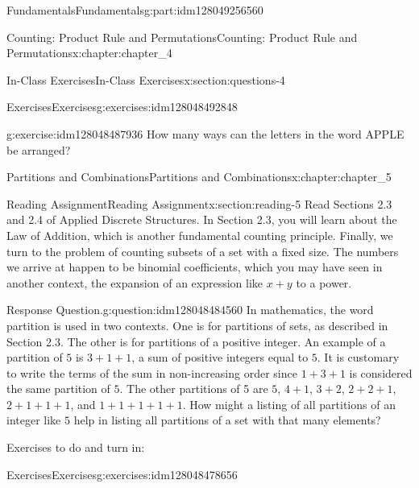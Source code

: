 \documentclass[oneside,10pt,]{book}
\numberwithin{equation}{section}
\begin{document}
\begin{partptx}{Fundamentals}{}{Fundamentals}{}{}{g:part:idm128049256560}
\begin{chapterptx}{Counting: Product Rule and Permutations}{}{Counting: Product Rule and Permutations}{}{}{x:chapter:chapter_4}
\begin{sectionptx}{In-Class Exercises}{}{In-Class Exercises}{}{}{x:section:questions-4}
\begin{exercises-subsection}{Exercises}{}{Exercises}{}{}{g:exercises:idm128048492848}
\begin{exercisegroup}
\begin{divisionexerciseeg}{4}{}{}{g:exercise:idm128048487936}
How many ways can the letters in the word APPLE be arranged?%
\end{divisionexerciseeg}%
\end{exercisegroup}
\par\medskip\noindent
\end{exercises-subsection}
\end{sectionptx}
\end{chapterptx}
%
\typeout{************************************************}
\typeout{************************************************}
%
\begin{chapterptx}{Partitions and Combinations}{}{Partitions and Combinations}{}{}{x:chapter:chapter_5}
%
%
%
\typeout{************************************************}
\typeout{************************************************}
%
\begin{sectionptx}{Reading Assignment}{}{Reading Assignment}{}{}{x:section:reading-5}
Read Sections 2.3 and 2.4 of Applied Discrete Structures. In Section 2.3, you will learn about the Law of Addition, which is another fundamental counting principle.  Finally, we turn to the problem of counting subsets of a set with a fixed size.  The numbers we arrive at happen to be binomial coefficients, which you may have seen in another context, the expansion of an expression like \(x + y\) to a power.%
\begin{question}{Response Question.}{g:question:idm128048484560}%
In mathematics, the word partition is used in two contexts. One is for partitions of sets, as described in Section 2.3. The other is for partitions of a positive integer.  An example of a partition of \(5\) is \(3+1+1\), a sum of positive integers equal to \(5\). It is customary to write the terms of the sum in non-increasing order since \(1+3+1\) is considered the same partition of \(5\). The other partitions of 5 are \(5\), \(4+1\), \(3+2\), \(2+2+1\), \(2+1+1+1\), and \(1+1+1+1+1\). How might a listing of all partitions of an integer like \(5\) help in listing all partitions of a set with that many elements?%
\end{question}
Exercises to do and turn in:%
%
%
\typeout{************************************************}
\typeout{************************************************}
%
\begin{exercises-subsection}{Exercises}{}{Exercises}{}{}{g:exercises:idm128048478656}
\par\medskip\noindent%

\end{exercises-subsection}
\end{sectionptx}
\end{chapterptx}
\end{partptx}
\end{document}
